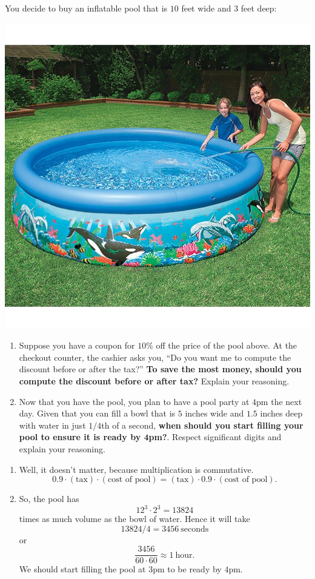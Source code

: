 \documentclass[nooutcomes,noauthor,handout,12pt]{ximera}
\begin{document}
\begin{question}
  You decide to buy an inflatable pool that is $10$ feet wide and $3$
  feet deep:
  \begin{center}
    \includegraphics[width=.4\textwidth]{tenFtPool.jpg}
  \end{center}
  \begin{enumerate}
    \item Suppose you have a coupon for $10\%$ off the price of the
      pool above. At the checkout counter, the cashier asks you, ``Do
      you want me to compute the discount before or after the tax?''
      \textbf{To save the most money, should you compute the discount
        before or after tax?} Explain your reasoning.
    \item Now that you have the pool, you plan to have a pool party at
      $4$pm the next day. Given that you can fill a bowl that is $5$
      inches wide and $1.5$ inches deep with water in just $1/4$th of
      a second, \textbf{when should you start filling your pool to
        ensure it is ready by $\boldsymbol 4$pm?}.  Respect significant digits and explain your reasoning.
  \end{enumerate}
  \begin{freeResponse}
    \begin{enumerate}
    \item Well, it doesn't matter, because multiplication is commutative.
      \[
      0.9 \cdot (\text{tax}) \cdot (\text{cost of pool})= (\text{tax})\cdot
      0.9\cdot (\text{cost of pool}).
      \]
    \item So, the pool has
      \[
      12^3 \cdot 2^3 = 13824
      \]
      times as much volume as the bowl of water. Hence it will take
      \[
      13824/4 = 3456 ~\text{seconds}
      \]
      or
      \[
      \frac{3456}{60\cdot 60} \approx 1~\text{hour}.
      \]
      We should start filling the pool at $3$pm to be ready by $4$pm.
    \end{enumerate}
  \end{freeResponse}
\end{question}
\mynewpage
\end{document}
